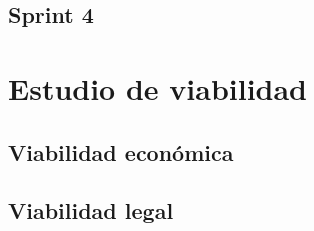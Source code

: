 \subsection{Sprint 4}


\section{Estudio de viabilidad}

\subsection{Viabilidad económica}

\subsection{Viabilidad legal}

